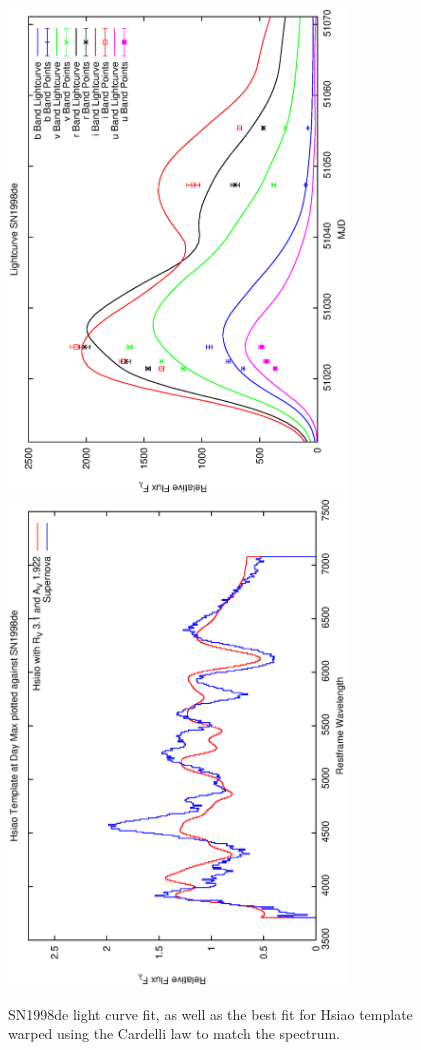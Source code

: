\clearpage

\begin{figure}[p]
\centering
\includegraphics[angle=-90,width=0.8\textwidth]{./figures/ltcv/SN1998de_v023_lightcurve.ps}
\hfill
\includegraphics[angle=-90,width=0.8\textwidth]{./figures/hsiao/SN1998de_v001_hsiao.ps}
\hfill
\caption{SN1998de light curve fit, as well as the best fit for Hsiao template warped using the Cardelli law to match the spectrum.}
\label{fig:SN1998defour2}
\end{figure}

